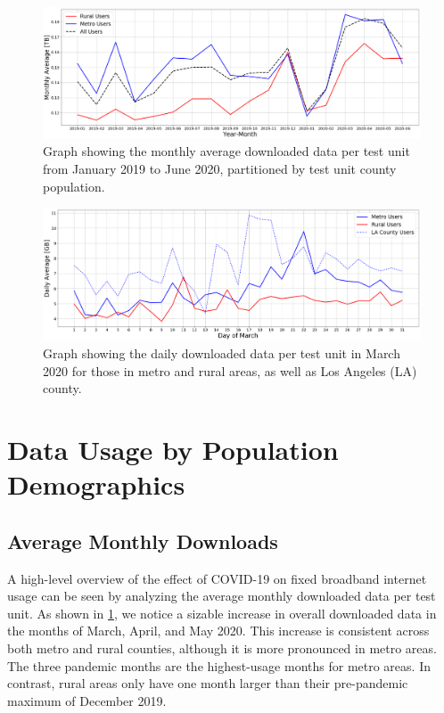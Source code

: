 \begin{figure}[t]
    \centering
    \includegraphics[width=1.0\linewidth]{figs/monthly_downloaded_data_notitle.png}
    \caption{Graph showing the monthly average downloaded data per test unit from January 2019 to June 2020, partitioned by test unit county population.}
    \label{fig:downloadmetro_rural}
\end{figure}

\begin{figure}[t]
    \centering
    \includegraphics[width=1.0\linewidth]{figs/daily_downloaded_data_notitle.png}
    \caption{Graph showing the daily downloaded data per test unit in March 2020 for those in metro and rural areas, as well as Los Angeles (LA) county.}
    \label{fig:dailymetro_rural}
\end{figure}

\section{Data Usage by Population Demographics}\label{sec:data-usage-by-population-demographics}

\subsection{Average Monthly Downloads}

A high-level overview of the effect of COVID-19 on fixed broadband internet usage can be seen by analyzing the average monthly downloaded data per test unit. As shown in \cref{fig:downloadmetro_rural}, we notice a sizable increase in overall downloaded data in the months of March, April, and May 2020. This increase is consistent across both metro and rural counties, although it is more pronounced in metro areas. The three pandemic months are the highest-usage months for metro areas. In contrast, rural areas only have one month larger than their pre-pandemic maximum of December 2019.

